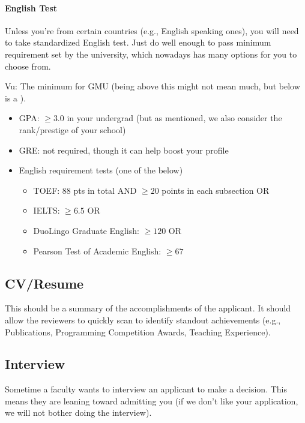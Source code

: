 \documentclass[11pt]{article}
\newcommand{\red}[1]{{\color{red}{#1}}}
\begin{document}
\paragraph{English Test} Unless you're from certain countries (e.g., English speaking ones), you will need to
take standardized English test. Just do well enough to pass minimum requirement set by the university, which nowadays has many options for you to choose from.

\begin{tcolorbox}[left=1pt,right=1pt,top=1pt,bottom=1pt]
Vu: The minimum for GMU (being above this might not mean much, but below is a \red{red flag}).
\begin{itemize}
\item GPA: $\ge 3.0$ in your undergrad (but as mentioned, we also consider the rank/prestige of your school)
\item GRE: not required, though it can help boost your profile
\item English requirement tests (one of the below)
  \begin{itemize}    
  \item TOEF: 88 pts in total AND $\ge 20$ points in each subsection OR
  \item IELTS: $\ge 6.5$ OR
  \item DuoLingo Graduate English: $\ge 120$ OR 
  \item Pearson Test of Academic English: $\ge 67$
  \end{itemize}  
\end{itemize}
\end{tcolorbox}


\subsection{CV/Resume}
This should be a summary of the accomplishments of the applicant.  It should allow the reviewers to quickly scan to identify standout achievements (e.g., Publications, Programming Competition Awards, Teaching Experience).

\subsection{Interview}

Sometime a faculty wants to interview an applicant to make a decision. This means they are leaning toward admitting you (if we don't like your application, we will not bother doing the interview).
\end{document}
